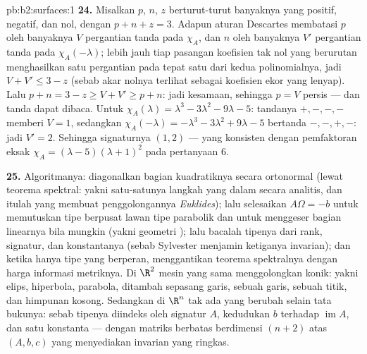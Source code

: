 \begin{solution}{pb:b2:surfaces:1}
\textbf{24.} Misalkan $p$, $n$, $z$ berturut-turut banyaknya  yang positif,
negatif, dan nol, dengan $p + n + z = 3$. Adapun aturan Descartes
membatasi $p$ oleh banyaknya $V$ pergantian tanda pada
$\chi_A$, dan $n$ oleh banyaknya $V'$ pergantian tanda pada
$\chi_A(-\lambda)$; lebih jauh tiap pasangan koefisien tak nol yang
berurutan menghasilkan satu pergantian pada tepat satu dari kedua
polinomialnya, jadi $V + V' \leq 3 - z$ (sebab akar nolnya terlihat
sebagai koefisien ekor yang lenyap). Lalu $p + n = 3 - z \geq
V + V' \geq p + n$: jadi kesamaan, sehingga $p = V$ persis --- dan
tanda  dapat dibaca. Untuk $\chi_A(\lambda)
= \lambda^3 - 3\lambda^2 - 9\lambda - 5$: tandanya $+,-,-,-$
memberi $V = 1$, sedangkan $\chi_A(-\lambda) = -\lambda^3 - 3\lambda^2
+ 9\lambda - 5$ bertanda $-,-,+,-$: jadi $V' = 2$. Sehingga signaturnya $(1,
2)$ --- yang konsisten dengan pemfaktoran eksak $\chi_A =
(\lambda - 5)(\lambda + 1)^2$ pada pertanyaan 6.

\textbf{25.} Algoritmanya: diagonalkan bagian kuadratiknya
secara ortonormal (lewat teorema spektral: yakni satu-satunya langkah yang
dalam secara analitis, dan itulah yang membuat penggolongannya
\emph{Euklides}); lalu selesaikan $A\Omega = -b$ untuk
memutuskan tipe berpusat lawan tipe parabolik dan untuk menggeser
bagian linearnya bila mungkin (yakni geometri ); lalu bacalah
tipenya dari rank, signatur, dan konstantanya (sebab Sylvester
menjamin ketiganya invarian); dan ketika hanya tipe 
yang berperan,  menggantikan teorema spektralnya dengan
harga informasi metriknya. Di $\R^2$ mesin yang sama
menggolongkan konik: yakni elips, hiperbola, parabola, ditambah
sepasang garis, sebuah garis, sebuah titik, dan himpunan kosong. Sedangkan di $\R^n$
tak ada yang berubah selain tata bukunya: sebab tipenya diindeks oleh
signatur $A$, kedudukan $b$ terhadap
$\operatorname{im}A$, dan satu konstanta --- dengan
matriks berbatas berdimensi $(n{+}2)$ atas $(A, b, c)$ yang
menyediakan invarian yang ringkas.

\end{solution}
